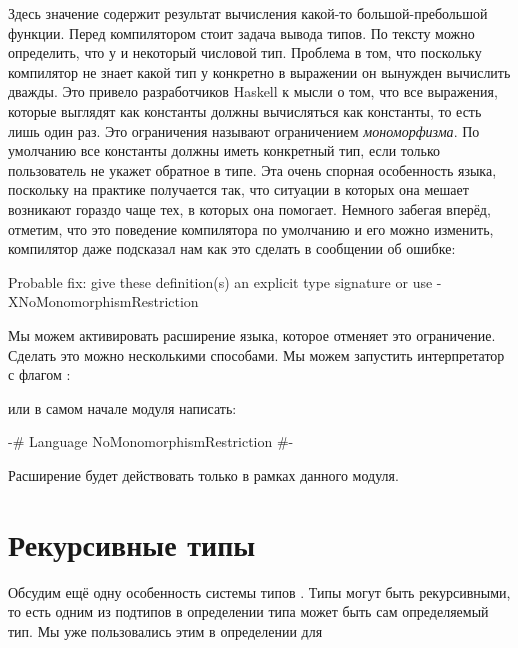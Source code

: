 Здесь значение  содержит результат вычисления
какой-то большой-пребольшой функции. Перед компилятором 
стоит задача вывода типов. По тексту можно определить,
что у  и  некоторый числовой тип. 
Проблема в том, что поскольку компилятор не знает какой тип
у  конкретно в выражении  он вынужден
вычислить  дважды. Это привело разработчиков 
Haskell к мысли о том, что все выражения, которые
выглядят как константы должны вычисляться как константы,
то есть лишь один раз. 
Это ограничения называют ограничением \emph{мономорфизма}.
По умолчанию все константы должны иметь конкретный тип, если 
только пользователь не укажет обратное в типе.
Эта очень спорная особенность языка, поскольку
на практике получается так, что ситуации в которых
она мешает возникают гораздо чаще тех, в которых 
она помогает. Немного забегая вперёд, отметим, что
это поведение компилятора по умолчанию и его можно
изменить, компилятор даже подсказал нам как это сделать
в сообщении об ошибке:

\begin{code}
    Probable fix: give these definition(s) an explicit type signature
                  or use -XNoMonomorphismRestriction
\end{code}

Мы можем активировать расширение языка, которое отменяет
это ограничение. Сделать это можно несколькими способами.
Мы можем запустить интерпретатор с флагом :


\noindent или в самом начале модуля написать:

\begin{code}
{-# Language NoMonomorphismRestriction #-}
\end{code}

Расширение будет действовать только в рамках данного модуля.


\section{Рекурсивные типы}

Обсудим ещё одну особенность системы типов . 
Типы могут быть рекурсивными,
то есть одним из подтипов в определении типа может быть
сам определяемый тип. Мы уже пользовались этим в определении
для 

